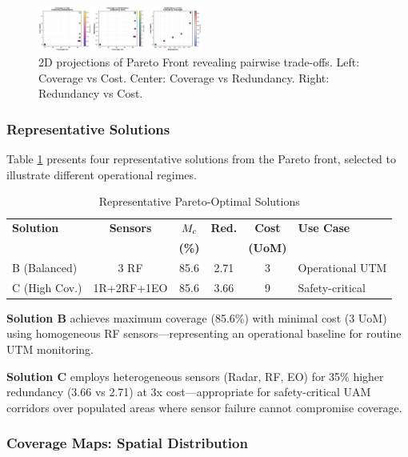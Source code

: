 \begin{figure}[t]
  \centering
  \includegraphics[width=0.48\textwidth]{figures/pareto_front_2d.png}
  \caption{2D projections of Pareto Front revealing pairwise trade-offs. Left: Coverage vs Cost. Center: Coverage vs Redundancy. Right: Redundancy vs Cost.}
  \label{fig:pareto2d}
\end{figure}

\subsubsection{Representative Solutions}

Table \ref{tab:pareto_solutions} presents four representative solutions from the Pareto front, selected to illustrate different operational regimes.

\begin{table}[h]
\centering
\caption{Representative Pareto-Optimal Solutions}
\label{tab:pareto_solutions}
\begin{tabular}{lccccp{3.5cm}}
\toprule
\textbf{Solution} & \textbf{Sensors} & $M_c$ & \textbf{Red.} & \textbf{Cost} & \textbf{Use Case} \\
 & & \textbf{(\%)} & & \textbf{(UoM)} & \\
\midrule
B (Balanced) & 3 RF & 85.6 & 2.71 & 3 & Operational UTM \\
C (High Cov.) & 1R+2RF+1EO & 85.6 & 3.66 & 9 & Safety-critical \\
\bottomrule
\end{tabular}
\end{table}

\textbf{Solution B} achieves maximum coverage (85.6\%) with minimal cost (3 UoM) using homogeneous RF sensors—representing an operational baseline for routine UTM monitoring.

\textbf{Solution C} employs heterogeneous sensors (Radar, RF, EO) for 35\% higher redundancy (3.66 vs 2.71) at 3x cost—appropriate for safety-critical UAM corridors over populated areas where sensor failure cannot compromise coverage.

\subsubsection{Coverage Maps: Spatial Distribution}

